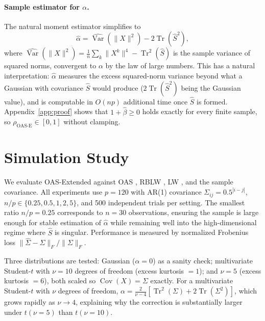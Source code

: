 \documentclass[journal]{IEEEtran}
\begin{document}
\paragraph{Sample estimator for $\alpha$.}
The natural moment estimator simplifies to
\begin{equation}
\hat{\alpha} = \widehat{\operatorname{Var}}(\lVert X\rVert^2) - 2\operatorname{Tr}(\hat{S}^2),
\end{equation}
where
$\widehat{\operatorname{Var}}(\lVert X\rVert^2)
  = \frac{1}{n}\sum_k\lVert X^k\rVert^4 - \operatorname{Tr}^2(\hat{S})$
is the sample variance of squared norms, convergent to $\alpha$ by the law of large numbers.
This has a natural interpretation: $\hat{\alpha}$ measures the excess squared-norm variance
beyond what a Gaussian with covariance $\hat{S}$ would produce
($2\operatorname{Tr}(\hat{S}^2)$ being the Gaussian value), and is computable in $O(np)$
additional time once $\hat{S}$ is formed.
Appendix~\ref{app:proof} shows that $1+\hat{\beta}\geq0$ holds exactly for every finite
sample, so $\rho_{\text{OAS-E}}\in[0,1]$ without clamping.

\section{Simulation Study}\label{sec-simulation}

We evaluate OAS-Extended against OAS \cite{OAS}, RBLW \cite{OAS}, LW \cite{LW2004},
and the sample covariance.
All experiments use $p=120$ with AR(1) covariance $\Sigma_{ij}=0.5^{|i-j|}$,
$n/p\in\{0.25,0.5,1,2,5\}$, and 500 independent trials per setting.
The smallest ratio $n/p=0.25$ corresponds to $n=30$ observations, ensuring the
sample is large enough for stable estimation of $\hat{\alpha}$ while remaining well
into the high-dimensional regime where $\hat{S}$ is singular.
Performance is measured by normalized Frobenius loss
$\lVert\hat{\Sigma}-\Sigma\rVert_F/\lVert\Sigma\rVert_F$.

Three distributions are tested: Gaussian ($\alpha=0$) as a sanity check; multivariate
Student-$t$ with $\nu=10$ degrees of freedom (excess kurtosis $=1$); and $\nu=5$
(excess kurtosis $=6$), both scaled so $\operatorname{Cov}(X)=\Sigma$ exactly.
For a multivariate Student-$t$ with $\nu$ degrees of freedom,
$\alpha = \frac{2}{\nu-4}[\operatorname{Tr}^2(\Sigma)+2\operatorname{Tr}(\Sigma^2)]$,
which grows rapidly as $\nu\to4$, explaining why the correction is substantially larger
under $t(\nu\!=\!5)$ than $t(\nu\!=\!10)$.
\end{document}
